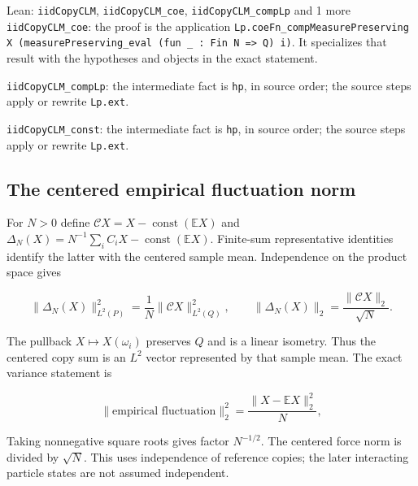 \documentclass[11pt,a4paper]{report}
\begin{document}
\begin{leanbox}{Lean: \texttt{iidCopyCLM}, \texttt{iidCopyCLM\_\allowbreak{}coe}, \texttt{iidCopyCLM\_\allowbreak{}compLp} and 1 more}
\texttt{iid\allowbreak{}Copy\allowbreak{}CLM\_\allowbreak{}coe}: the proof is the application \texttt{Lp.\allowbreak{}coe\allowbreak{}Fn\_\allowbreak{}comp\allowbreak{}Measure\allowbreak{}Preserving X (measure\allowbreak{}Preserving\_\allowbreak{}eval (fun \_\allowbreak{} : Fin N => Q) i)}. It specializes that result with the hypotheses and objects in the exact statement.



\texttt{iid\allowbreak{}Copy\allowbreak{}CLM\_\allowbreak{}comp\allowbreak{}Lp}: the intermediate fact is \texttt{hp}, in source order; the source steps apply or rewrite \texttt{Lp.\allowbreak{}ext}.



\texttt{iid\allowbreak{}Copy\allowbreak{}CLM\_\allowbreak{}const}: the intermediate fact is \texttt{hp}, in source order; the source steps apply or rewrite \texttt{Lp.\allowbreak{}ext}.
\end{leanbox}
\subsection{\texorpdfstring{The centered empirical fluctuation norm}{The centered empirical fluctuation norm}}
\label{report-step-ProximalLangevin-MeanFieldCopies-lean-2}


For \(N>0\) define \(\mathcal C X=X-\operatorname{const}(\mathbb EX)\) and \(\Delta_N(X)=N^{-1}\sum_iC_iX-\operatorname{const}(\mathbb EX)\). Finite-sum representative identities identify the latter with the centered sample mean. Independence on the product space gives

\[\|\Delta_N(X)\|_{L^2(P)}^2=\frac1N\|\mathcal C X\|_{L^2(Q)}^2,\qquad\|\Delta_N(X)\|_2=\frac{\|\mathcal C X\|_2}{\sqrt N}.\]

The pullback \(X\mapsto X(\omega_i)\) preserves \(Q\) and is a linear isometry. Thus the centered copy sum is an \(L^2\) vector represented by that sample mean. The exact variance statement is

\[\|\text{empirical fluctuation}\|_2^2=\frac{\|X-\mathbb EX\|_2^2}{N},\]

Taking nonnegative square roots gives factor \(N^{-1/2}\). The centered force norm is divided by \(\sqrt N\). This uses independence of reference copies; the later interacting particle states are not assumed independent.
\end{document}
